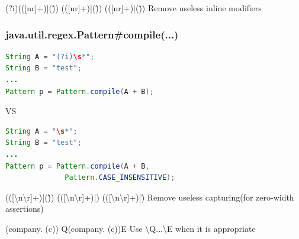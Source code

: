 \documentclass[14pt]{beamer}
\begin{document}
  {(?i)(([\doubleslash{}n\doubleslash{}r]+)|(\^))}
  {(([\doubleslash{}n\doubleslash{}r]+)|(\^))}
  {(([\doubleslash{}n\doubleslash{}r]+)|(\^))}
  {Remove useless inline modifiers}

\begin{frame}[fragile]
\frametitle{java.util.regex.Pattern\#compile(...)}
  \begin{lstlisting}[language=Java, frame=single, basicstyle=\small, stringstyle=\color{myOrange}]
String A = "(?i)\s*";
String B = "test";
...
Pattern p = Pattern.compile(A + B);
  \end{lstlisting}
  \begin{center}VS\end{center}
  \begin{lstlisting}[language=Java, frame=single, basicstyle=\small, stringstyle=\color{myOrange}]
String A = "\s*";
String B = "test";
...
Pattern p = Pattern.compile(A + B,
              Pattern.CASE_INSENSITIVE);
  \end{lstlisting}
\end{frame}
  {(([\textbackslash{}n\textbackslash{}r]+)|(\^))}
  {(([\textbackslash{}n\textbackslash{}r]+)|)}
  {(([\textbackslash{}n\textbackslash{}r]+)|\^)}
  {Remove useless capturing(for zero-width assertions)}

  {\doubleslash{}(company\doubleslash{}. \doubleslash{}(c\doubleslash{})\doubleslash{})}
  {}
  {\doubleslash{}Q(company. (c))\doubleslash{}E}
  {Use \textbackslash{}Q...\textbackslash{}E when it is appropriate}
\end{document}
